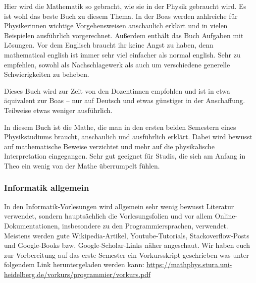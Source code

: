 \begin{description}[style=unboxed]
\item[Boas: Mathematical Methods in the Physical Science]{
		Hier wird die Mathematik so gebracht, wie sie in der Physik gebraucht wird. Es ist wohl das beste Buch zu diesem Thema. In der Boas werden zahlreiche für Physikerinnen wichtige Vorgehensweisen anschaulich erklärt und in vielen Beispielen ausführlich vorgerechnet. Außerdem enthält das Buch Aufgaben mit Lösungen. Vor dem Englisch braucht ihr keine Angst zu haben, denn mathematical english ist immer sehr viel einfacher als normal english. Sehr zu empfehlen, sowohl als Nachschlagewerk als auch um verschiedene generelle Schwierigkeiten zu beheben.}

\item[Lang, Pucker: Mathematische Methoden in der Physik]{
		Dieses Buch wird zur Zeit von den Dozentinnen empfohlen und ist in etwa äquivalent zur Boas -- nur auf Deutsch und etwas günstiger in der Anschaffung. Teilweise etwas weniger ausführlich.}

\item[Otto: Rechenmethoden für Studierende d. Physik im ersten Jahr]{
		In diesem Buch ist die Mathe, die man in den ersten beiden Semestern eines Physikstudiums braucht, anschaulich und ausführlich erklärt. Dabei wird bewusst auf mathematische Beweise verzichtet und mehr auf die physikalische Interpretation eingegangen. Sehr gut geeignet für Studis, die sich am Anfang in Theo ein wenig von der Mathe überrumpelt fühlen.}
\end{description}

\subsubsection{Informatik allgemein}
In den Informatik-Vorlesungen wird allgemein sehr wenig bewusst Literatur verwendet, sondern hauptsächlich die Vorlesungsfolien und vor allem Online-Dokumentationen, insbesondere zu den Programmiersprachen, verwendet. Meistens werden gute Wikipedia-Artikel, Youtube-Tutorials, Stackoverflow-Posts und Google-Books bzw. Google-Scholar-Links näher angeschaut. Wir haben euch zur Vorbereitung auf das erste Semester ein Vorkursskript geschrieben was unter folgendem Link heruntergeladen werden kann:  \url{https://mathphys.stura.uni-heidelberg.de/vorkurs/programmier/vorkurs.pdf}

